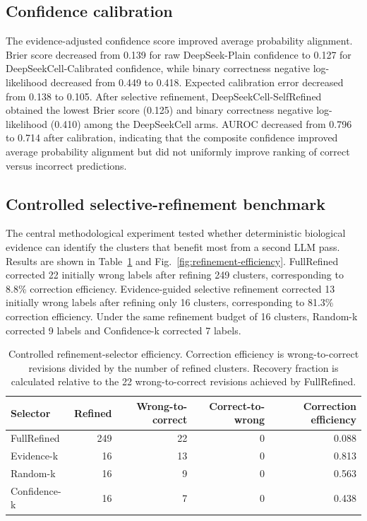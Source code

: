 \documentclass[unnumsec,webpdf,contemporary,large,numbered]{oup-authoring-template}
\begin{document}
\FloatBarrier

\subsection{Confidence calibration}

The evidence-adjusted confidence score improved average probability alignment. Brier score decreased from 0.139 for raw DeepSeek-Plain confidence to 0.127 for DeepSeekCell-Calibrated confidence, while binary correctness negative log-likelihood decreased from 0.449 to 0.418. Expected calibration error decreased from 0.138 to 0.105. After selective refinement, DeepSeekCell-SelfRefined obtained the lowest Brier score (0.125) and binary correctness negative log-likelihood (0.410) among the DeepSeekCell arms. AUROC decreased from 0.796 to 0.714 after calibration, indicating that the composite confidence improved average probability alignment but did not uniformly improve ranking of correct versus incorrect predictions.

\subsection{Controlled selective-refinement benchmark}

The central methodological experiment tested whether deterministic biological evidence can identify the clusters that benefit most from a second LLM pass. Results are shown in Table~\ref{tab:refinement-efficiency} and Fig.~\ref{fig:refinement-efficiency}. FullRefined corrected 22 initially wrong labels after refining 249 clusters, corresponding to 8.8\% correction efficiency. Evidence-guided selective refinement corrected 13 initially wrong labels after refining only 16 clusters, corresponding to 81.3\% correction efficiency. Under the same refinement budget of 16 clusters, Random-k corrected 9 labels and Confidence-k corrected 7 labels.

\begin{table}[!t]
\caption{Controlled refinement-selector efficiency. Correction efficiency is wrong-to-correct revisions divided by the number of refined clusters. Recovery fraction is calculated relative to the 22 wrong-to-correct revisions achieved by FullRefined.}
\label{tab:refinement-efficiency}
\centering
\begin{tabular}{lrrrr}
\toprule
Selector & Refined & Wrong-to-correct & Correct-to-wrong & Correction efficiency\\
\midrule
FullRefined & 249 & 22 & 0 & 0.088\\
Evidence-k & 16 & 13 & 0 & 0.813\\
Random-k & 16 & 9 & 0 & 0.563\\
Confidence-k & 16 & 7 & 0 & 0.438\\
\bottomrule
\end{tabular}
\end{table}
\end{document}
